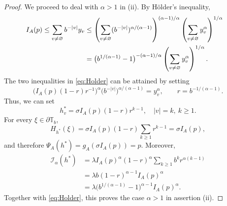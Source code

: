 \documentclass[10pt,a4paper]{amsart}
\begin{document}
\begin{proof}
\par
We proceed to deal with \(\alpha>1\) in (ii). By H\"older's inequality,
\begin{align}\label{eq:Holder}
  I_A(p)
  \le\sum_{v\ne\varnothing}b^{-\lvert v\rvert}y_v&\le\left(\sum_{v\ne\varnothing}
       (b^{-\lvert v\rvert})^{\alpha/(\alpha-1)}\right)^{(\alpha-1)/\alpha}
       \left(\sum_{v\ne\varnothing}y_v^\alpha\right)^{1/\alpha}\cr
  &=\bigl(b^{1/(\alpha-1)}-1\bigr)^{-(\alpha-1)/\alpha}
       \left(\sum_{v\ne\varnothing}y_v^\alpha\right)^{1/\alpha}.
\end{align}
The two inequalities in \eqref{eq:Holder} can be attained by setting
\[
  \bigl(I_A(p)(1-r)r^{-1}\bigr)^\alpha
  \bigl(b^{-\lvert v\rvert}\bigr)^{\alpha/(\alpha-1)}=y_v^\alpha,
  \qquad r=b^{-1/(\alpha-1)}.
\]
Thus, we can set
\[
  h_v^*=\sigma I_A(p)(1-r)r^{k-1},
  \quad |v|=k,~k\geq1.
\]
For every \(\xi\in\partial\mathbb{T}_b\),
\[
  H_{h^*}(\xi)
  =\sigma I_A(p)(1-r)\sum_{k\geq1}r^{k-1}
  =\sigma I_A(p),
\]
and therefore \(\Psi_A(h^*)=g_A(\sigma I_A(p))=p\). Moreover,
\begin{align*}
  \mathcal{I_{\alpha}}(h^*)
  &=\lambda I_A(p)^\alpha(1-r)^\alpha
    \sum_{k\geq1}b^k r^{\alpha(k-1)}\\
  &=\lambda b(1-r)^{\alpha-1}I_A(p)^\alpha\\
  &=\lambda\bigl(b^{1/(\alpha-1)}-1\bigr)^{\alpha-1}
    I_A(p)^\alpha.
\end{align*}
Together with \eqref{eq:Holder}, this proves the case \(\alpha>1\) in assertion \textup{(ii)}.
\end{proof}
\end{document}
